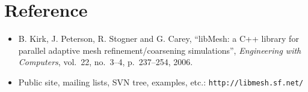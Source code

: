 \section*{Reference}
\begin{frame}[t]
  \begin{block}{}
    \begin{itemize}
    \item{
      B. Kirk, J. Peterson, R. Stogner and G. Carey, ``libMesh: a C++
      library for parallel adaptive mesh refinement/coarsening
      simulations'',  \emph{Engineering with Computers}, vol.~22, no.~3--4, p.~237--254, 2006.
      }
    \item{
      Public site, mailing lists, SVN tree, examples, etc.:
\texttt{http://libmesh.sf.net/}
      }
    \end{itemize}
  \end{block}
\end{frame}

